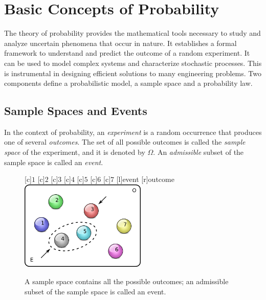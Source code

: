 \chapter[Basic Concepts]{Basic Concepts of Probability}

The theory of probability provides the mathematical tools necessary to study and analyze uncertain phenomena that occur in nature.
It establishes a formal framework to understand and predict the outcome of a random experiment.
It can be used to model complex systems and characterize stochastic processes.
This is instrumental in designing efficient solutions to many engineering problems.
Two components define a probabilistic model, a sample space and a probability law.


\section{Sample Spaces and Events}

In the context of probability, an \emph{experiment} is a random occurrence that produces one of several \emph{outcomes}.
The set of all possible outcomes is called the \emph{sample space} of the experiment, and it is denoted by $\Omega$.
An \emph{admissible} subset of the sample space is called an \emph{event}.

\begin{figure}[htb!]
\begin{center}
\begin{psfrags}
[c]{$1$}
[c]{$2$}
[c]{$3$}
[c]{$4$}
[c]{$5$}
[c]{$6$}
[c]{$7$}
[l]{event}
[r]{outcome}
\includegraphics[height=4.275cm]{Figures/2Chapter/samplespace}
\end{psfrags}
\caption{A sample space contains all the possible outcomes; an admissible subset of the sample space is called an event.}
\label{figure:SampleSpace}
\end{center}
\end{figure}

